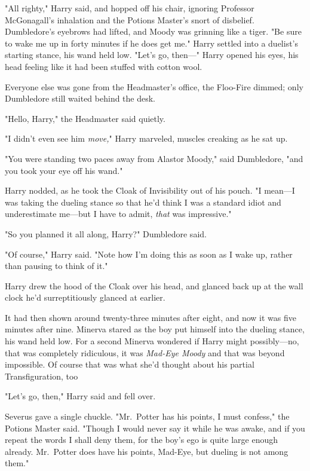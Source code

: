 "All righty," Harry said, and hopped off his chair, ignoring Professor
McGonagall's inhalation and the Potions Master's snort of disbelief.
Dumbledore's eyebrows had lifted, and Moody was grinning like a tiger. "Be sure
to wake me up in forty minutes if he does get me." Harry settled into a
duelist's starting stance, his wand held low. "Let's go, then\mbox{---}"
\sbreak
Harry opened his eyes, his head feeling like it had been stuffed with cotton
wool.

Everyone else was gone from the Headmaster's office, the Floo-Fire dimmed; only
Dumbledore still waited behind the desk.

"Hello, Harry," the Headmaster said quietly.

"I didn't even see him \emph{move,}" Harry marveled, muscles creaking as he
sat up.

"You were standing two paces away from Alastor Moody," said Dumbledore, "and
you took your eye off his wand."

Harry nodded, as he took the Cloak of Invisibility out of his pouch. "I
mean---I was taking the dueling stance so that he'd think I was a standard
idiot and underestimate me---but I have to admit, \emph{that} was impressive."

"So you planned it all along, Harry?" Dumbledore said.

"Of course," Harry said. "Note how I'm doing this as soon as I wake up, rather
than pausing to think of it."

Harry drew the hood of the Cloak over his head, and glanced back up at the wall
clock he'd surreptitiously glanced at earlier.

It had then shown around twenty-three minutes after eight, and now it was five
minutes after nine.
\sbreak
Minerva stared as the boy put himself into the dueling stance, his wand held
low. For a second Minerva wondered if Harry might possibly---no, that was
completely ridiculous, it was \emph{Mad-Eye Moody} and that was beyond
impossible. Of course that was what she'd thought about his partial
Transfiguration, too{\el}

"Let's go, then," Harry said and fell over.

Severus gave a single chuckle. "Mr.~Potter has his points, I must confess," the
Potions Master said. "Though I would never say it while he was awake, and if
you repeat the words I shall deny them, for the boy's ego is quite large enough
already. Mr.~Potter does have his points, Mad-Eye, but dueling is not among
them."

